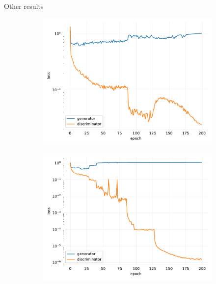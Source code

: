 \documentclass[12pt]{beamer}
\begin{document}
\begin{frame}{Other results}
\begin{figure}[H]
\begin{subfigure}[b]{0.3\textwidth}
            \end{subfigure}
            \hfill
            \begin{subfigure}[b]{0.3\textwidth}
                \centering
                \includegraphics[width=\textwidth]{resources/cycle-gan/main.pdf}
            \end{subfigure}
            \hfill
            \begin{subfigure}[b]{0.3\textwidth}
                \centering
                \includegraphics[width=\textwidth]{resources/cycle-gan/main3.pdf}
            \end{subfigure}
            \hfill
        \end{figure}
    \end{frame}
    
\end{document}
